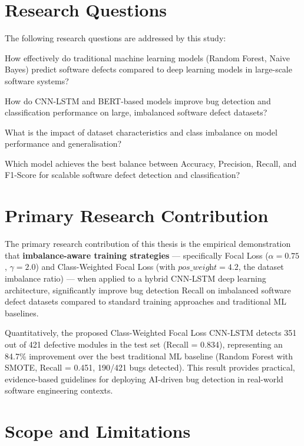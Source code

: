 \documentclass[12pt,a4paper,oneside]{report}
\begin{document}
\section{Research Questions}

The following research questions are addressed by this study:

\begin{description}[leftmargin=2em]
  \item[RQ1:] How effectively do traditional machine learning models (Random Forest, Naive Bayes) predict software defects compared to deep learning models in large-scale software systems?
  \item[RQ2:] How do CNN-LSTM and BERT-based models improve bug detection and classification performance on large, imbalanced software defect datasets?
  \item[RQ3:] What is the impact of dataset characteristics and class imbalance on model performance and generalisation?
  \item[RQ4:] Which model achieves the best balance between Accuracy, Precision, Recall, and F1-Score for scalable software defect detection and classification?
\end{description}

\section{Primary Research Contribution}

The primary research contribution of this thesis is the empirical demonstration that \textbf{imbalance-aware training strategies} --- specifically Focal Loss ($\alpha = 0.75$, $\gamma = 2.0$) and Class-Weighted Focal Loss (with $\textit{pos\_weight} = 4.2$, the dataset imbalance ratio) --- when applied to a hybrid CNN-LSTM deep learning architecture, significantly improve bug detection Recall on imbalanced software defect datasets compared to standard training approaches and traditional ML baselines.

Quantitatively, the proposed Class-Weighted Focal Loss CNN-LSTM detects 351 out of 421 defective modules in the test set (Recall = 0.834), representing an 84.7\% improvement over the best traditional ML baseline (Random Forest with SMOTE, Recall = 0.451, 190/421 bugs detected). This result provides practical, evidence-based guidelines for deploying AI-driven bug detection in real-world software engineering contexts.

\section{Scope and Limitations}
\end{document}
